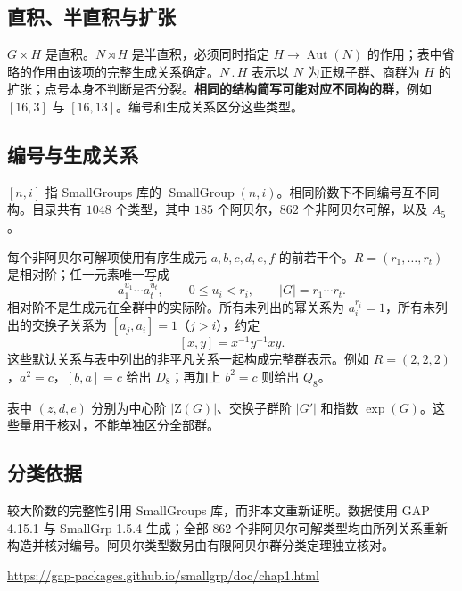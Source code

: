 \documentclass[UTF8,fontset=fandol,11pt,a4paper]{ctexart}
\newcommand{\Aut}{\operatorname{Aut}}\newcommand{\GL}{\operatorname{GL}}\newcommand{\ord}{\operatorname{ord}}\newcommand{\Z}{\mathrm Z}
\begin{document}
\subsection*{直积、半直积与扩张}
$G\times H$ 是直积。$N\rtimes H$ 是半直积，必须同时指定 $H\to\Aut(N)$ 的作用；表中省略的作用由该项的完整生成关系确定。$N\mathbin{.}H$ 表示以 $N$ 为正规子群、商群为 $H$ 的扩张；点号本身不判断是否分裂。\textbf{相同的结构简写可能对应不同构的群}，例如 $[16,3]$ 与 $[16,13]$。编号和生成关系区分这些类型。

\subsection*{编号与生成关系}
$[n,i]$ 指 SmallGroups 库的 $\operatorname{SmallGroup}(n,i)$。相同阶数下不同编号互不同构。目录共有 $1048$ 个类型，其中 $185$ 个阿贝尔，$862$ 个非阿贝尔可解，以及 $A_5$。

每个非阿贝尔可解项使用有序生成元 $a,b,c,d,e,f$ 的前若干个。$R=(r_1,\ldots,r_t)$ 是相对阶；任一元素唯一写成
\[a_1^{u_1}\cdots a_t^{u_t},\qquad0\leq u_i<r_i,\qquad |G|=r_1\cdots r_t.\]
相对阶不是生成元在全群中的实际阶。所有未列出的幂关系为 $a_i^{r_i}=1$，所有未列出的交换子关系为 $[a_j,a_i]=1$（$j>i$），约定
\[[x,y]=x^{-1}y^{-1}xy.\]
这些默认关系与表中列出的非平凡关系一起构成完整群表示。例如 $R=(2,2,2)$，$a^2=c$，$[b,a]=c$ 给出 $D_8$；再加上 $b^2=c$ 则给出 $Q_8$。

表中 $(z,d,e)$ 分别为中心阶 $|\Z(G)|$、交换子群阶 $|G'|$ 和指数 $\exp(G)$。这些量用于核对，不能单独区分全部群。

\subsection*{分类依据}
较大阶数的完整性引用 SmallGroups 库，而非本文重新证明。数据使用 GAP 4.15.1 与 SmallGrp 1.5.4 生成；全部 $862$ 个非阿贝尔可解类型均由所列关系重新构造并核对编号。阿贝尔类型数另由有限阿贝尔群分类定理独立核对。

\url{https://gap-packages.github.io/smallgrp/doc/chap1.html}
\end{document}
